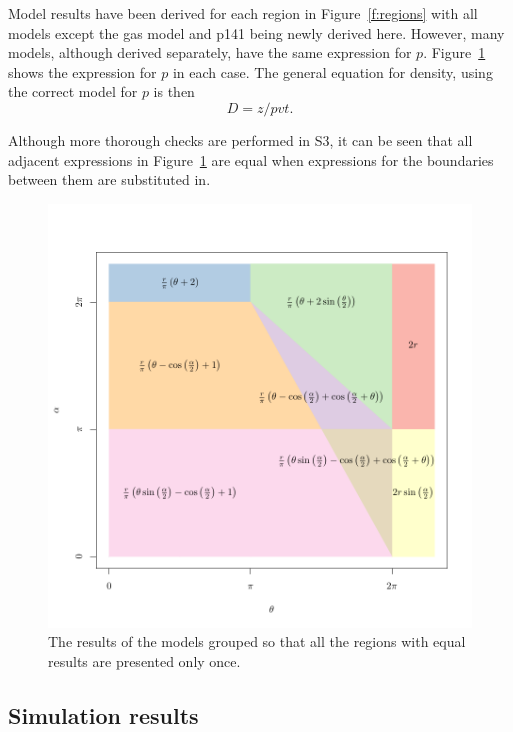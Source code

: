 \documentclass[a4paper,10pt,reqno,oneside]{amsart}
\begin{document}
Model results have been derived for each region in Figure~\ref{f:regions} with all models except the gas model and p141 being newly derived here. However, many models, although derived separately, have the same expression for $p$. Figure~\ref{f:equalModelResults} shows the expression for $p$ in each case. The general equation for density, using the correct model for $p$ is then
\begin{equation}
\label{e:D}
	D = z/pvt.
\end{equation}

Although more thorough checks are performed in S3, it can be seen that all adjacent expressions in Figure~\ref{f:equalModelResults} are equal when expressions for the boundaries between them are substituted in.

\begin{figure}
\centering
\includegraphics[width=1\textwidth]{imgs/equalModelResults.pdf}
\caption{The results of the models grouped so that all the regions with equal results are presented only once.}
\label{f:equalModelResults}
\end{figure}




\subsection{Simulation results}
\end{document}
